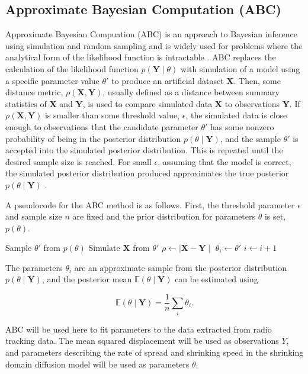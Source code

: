  \subsection{Approximate Bayesian Computation
(ABC)}
 Approximate Bayesian Compuation (ABC) is an approach to Bayesian
inference using
 simulation and random sampling \cite{Beaumont2002,
Sisson2010} and is widely used for problems where the analytical form of the likelihood function is intractable \cite{myung2003tutorial}.
 ABC replaces the calculation
 of the likelihood function
$p(\bm{Y}
\mid \theta)$ with simulation of a model using a specific parameter
value
$\theta'$ to produce an artificial dataset
 $\bm{X}$. Then, some
distance metric,
$\rho (\bm{X}, \bm{Y}) $, usually defined
 as a distance
between summary
statistics of $\bm{X}$ and $\bm{Y}$, is used to
 compare
simulated data $\bm{X}$
to observations $\bm{Y}$. If $\rho (\bm{X},
 \bm{Y}) $
is smaller than some
threshold value, $\epsilon$, the simulated data is
 close
enough to observations
that the candidate parameter $\theta'$ has some
nonzero probability of being in
the posterior distribution $ p(\theta \mid \bm{Y})$, and the sample $\theta'$
is accepted into the simulated posterior
distribution. This is repeated until
the desired sample size is reached. For
small $\epsilon$, assuming that the
model is correct, the simulated posterior
distribution produced approximates
the
 true posterior $ p(\theta \mid
\bm{Y})$ \cite{Sisson2010}.

A pseudocode for the ABC method is as
follows. First, the threshold parameter $\epsilon$ and sample size $n$ are fixed and the
 prior distribution for parameters $\theta$ is set, $p(\theta)$.
 \begin{algorithmic}
     \State Sample $\theta'$ from $p(\theta)$
     \State Simulate $\bm{X}$ from $\theta '$
     \State $\rho \gets \mid \bm{X} - \bm{Y} \mid$
\If {$\rho < \epsilon$}
  \State $\theta_i \gets \theta '$
  \State $i \gets i + 1$
\EndIf
\EndWhile
 \end{algorithmic}
The parameters $\theta_i$ are an approximate sample from the posterior distribution $p(\theta \mid \bm{Y})$, and the posterior mean $\mathbb{E}(\theta \mid \bm{Y})$ can be estimated using

\begin{equation}
\mathbb{E}(\theta \mid \bm{Y}) = \frac{1}{n} \sum_i \theta_i .
\end{equation}

ABC will be used here to fit parameters to the data extracted from radio tracking data. The mean squared displacement will be used as observations $Y$, and parameters describing the rate of spread and shrinking speed in the shrinking domain diffusion model will be used as parameters $\theta$. 
